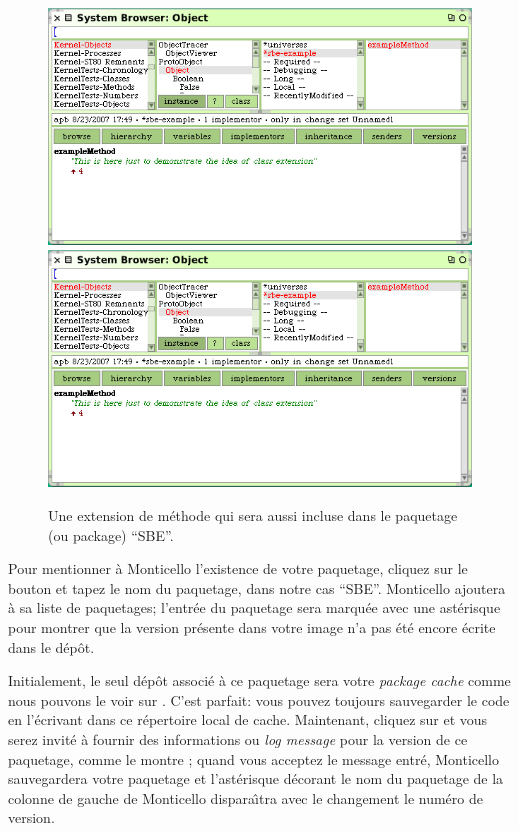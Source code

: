 \documentclass[a4paper,10pt,twoside]{book}
\begin{document}
\begin{figure}[btp]
	\begin{center}
	\ifluluelse
		{\includegraphics[width=\textwidth]{MCnewmethod}}
		{\includegraphics[scale=0.7]{MCnewmethod}}
	\end{center}
	\caption{Une extension de m\'ethode qui sera aussi incluse dans le paquetage (ou package) ``SBE''.}
	\label{fig:MCnewmethod}
\end{figure}

Pour mentionner \`a Monticello l'existence de votre paquetage, 
cliquez sur le bouton  et tapez le nom du paquetage,
dans notre cas ``SBE''.
Monticello ajoutera  \`a sa liste de paquetages;
l'entr\'ee du paquetage sera marqu\'ee avec une ast\'erisque pour
montrer que la version pr\'esente dans votre image n'a pas
\'et\'e encore \'ecrite dans le d\'ep\^ot.

Initialement, le seul d\'ep\^ot associ\'e \`a ce paquetage sera votre
\emph{package cache} comme nous pouvons le voir sur .
C'est parfait: vous pouvez toujours sauvegarder le code en l'\'ecrivant
dans ce r\'epertoire local de cache.
Maintenant, cliquez sur  et vous serez invit\'e \`a
fournir des informations ou \emph{log message} pour la version de ce 
paquetage, comme le montre ; 
quand vous acceptez le message entr\'e, Monticello sauvegardera votre paquetage
et l'ast\'erisque d\'ecorant le nom du paquetage de la colonne de gauche
de Monticello dispara\^{\i}tra avec le changement le num\'ero de version.
\end{document}
